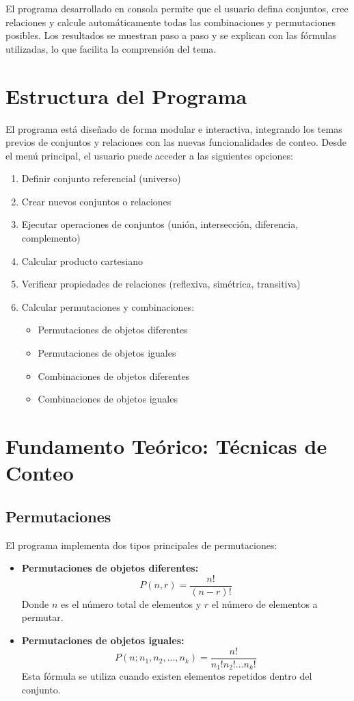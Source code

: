 \documentclass[12pt]{article}
\begin{document}
El programa desarrollado en consola permite que el usuario defina conjuntos, cree relaciones y calcule automáticamente
todas las combinaciones y permutaciones posibles. Los resultados se muestran paso a paso y se explican con las fórmulas 
utilizadas, lo que facilita la comprensión del tema.

\section{Estructura del Programa}
El programa está diseñado de forma modular e interactiva, integrando los temas previos de conjuntos y relaciones
con las nuevas funcionalidades de conteo. Desde el menú principal, el usuario puede acceder a las siguientes opciones:

\begin{enumerate}
    \item Definir conjunto referencial (universo)
    \item Crear nuevos conjuntos o relaciones
    \item Ejecutar operaciones de conjuntos (unión, intersección, diferencia, complemento)
    \item Calcular producto cartesiano
    \item Verificar propiedades de relaciones (reflexiva, simétrica, transitiva)
    \item Calcular permutaciones y combinaciones:
    \begin{itemize}
        \item Permutaciones de objetos diferentes
        \item Permutaciones de objetos iguales
        \item Combinaciones de objetos diferentes
        \item Combinaciones de objetos iguales
    \end{itemize}
\end{enumerate}

\section{Fundamento Teórico: Técnicas de Conteo}
\subsection{Permutaciones}
El programa implementa dos tipos principales de permutaciones:

\begin{itemize}
    \item \textbf{Permutaciones de objetos diferentes:}
    \[
        P(n,r) = \frac{n!}{(n-r)!}
    \]
    Donde $n$ es el número total de elementos y $r$ el número de elementos a permutar.
    
    \item \textbf{Permutaciones de objetos iguales:}
    \[
        P(n; n_1, n_2, ..., n_k) = \frac{n!}{n_1!n_2!...n_k!}
    \]
    Esta fórmula se utiliza cuando existen elementos repetidos dentro del conjunto.
\end{itemize}
\end{document}
